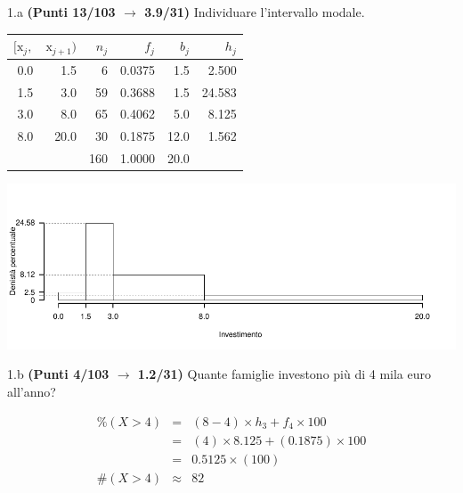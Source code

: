 \documentclass[
  11pt,
]{book}
\theoremstyle{mytheoremstyle}
\theoremstyle{mydefstyle}
\newenvironment{sol}
  {
  \begin{tcolorbox}[enhanced,breakable,arc=0.1mm,boxrule=1pt,colback=white,colframe=iblue,
  title=\bf \fontfamily{lmss}\selectfont \hspace{.5 cm} Soluzione,drop fuzzy shadow]

}{
\end{tcolorbox}
  }
\begin{document}
1.a \textbf{(Punti 13/103 \(\rightarrow\) 3.9/31)} Individuare l'intervallo modale.

\begin{sol}

\begin{table}[H]
\centering
\begin{tabular}{rrrrrr}
\toprule
$[\text{x}_j,$ & $\text{x}_{j+1})$ & $n_j$ & $f_j$ & $b_j$ & $h_j$\\
\midrule
0.0 & 1.5 & 6 & 0.0375 & 1.5 & 2.500\\
1.5 & 3.0 & 59 & 0.3688 & 1.5 & 24.583\\
3.0 & 8.0 & 65 & 0.4062 & 5.0 & 8.125\\
8.0 & 20.0 & 30 & 0.1875 & 12.0 & 1.562\\
 &  & 160 & 1.0000 & 20.0 & \\
\bottomrule
\end{tabular}
\end{table}

\begin{center}\includegraphics{Esami_passati_con_soluzioni_files/figure-latex/2024-53-1} \end{center}

\end{sol}

1.b \textbf{(Punti 4/103 \(\rightarrow\) 1.2/31)} Quante famiglie investono più di 4 mila euro all'anno?

\begin{sol}
\begin{eqnarray*}
     \%(X> 4 ) &=& ( 8 - 4 )\times h_{ 3 }+ f_{ 4 }\times 100 \\
              &=& ( 4 )\times 8.125 + ( 0.1875 )\times 100 \\
              &=&  0.5125 \times(100)\\
     \#(X> 4 ) &\approx& 82 
         \end{eqnarray*}

\end{sol}
\end{document}
